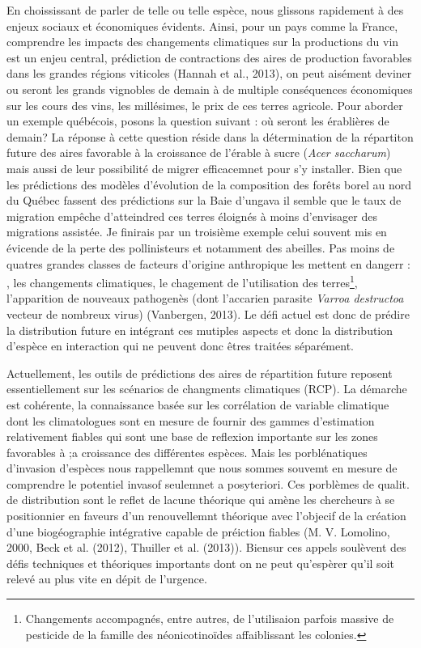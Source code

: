 En choississant de parler de telle ou telle espèce, nous glissons
rapidement à des enjeux sociaux et économiques évidents. Ainsi, pour un
pays comme la France, comprendre les impacts des changements climatiques
sur la productions du vin est un enjeu central, prédiction de
contractions des aires de production favorables dans les grandes régions
viticoles (Hannah et al., 2013), on peut aisément deviner ou seront les
grands vignobles de demain à de multiple conséquences économiques sur
les cours des vins, les millésimes, le prix de ces terres agricole. Pour
aborder un exemple québécois, posons la question suivant : où seront les
érablières de demain? La réponse à cette question réside dans la
détermination de la répartiton future des aires favorable à la
croissance de l'érable à sucre (\emph{Acer saccharum}) mais aussi de
leur possibilité de migrer efficacemnet pour s'y installer. Bien que les
prédictions des modèles d'évolution de la composition des forêts borel
au nord du Québec fassent des prédictions sur la Baie d'ungava il semble
que le taux de migration empêche d'atteindred ces terres éloignés à
moins d'envisager des migrations assistée. Je finirais par un troisième
exemple celui souvent mis en évicende de la perte des pollinisteurs et
notamment des abeilles. Pas moins de quatres grandes classes de facteurs
d'origine anthropique les mettent en dangerr : , les changements
climatiques, le chagement de l'utilisation des terres\footnote{Changements
  accompagnés, entre autres, de l'utilisaion parfois massive de
  pesticide de la famille des néonicotinoïdes affaiblissant les
  colonies.}, l'apparition de nouveaux pathogenès (dont l'accarien
parasite \emph{Varroa destructoa} vecteur de nombreux virus) (Vanbergen,
2013). Le défi actuel est donc de prédire la distribution future en
intégrant ces mutiples aspects et donc la distribution d'espèce en
interaction qui ne peuvent donc êtres traitées séparément.

Actuellement, les outils de prédictions des aires de répartition future
reposent essentiellement sur les scénarios de changments climatiques
(RCP). La démarche est cohérente, la connaissance basée sur les
corrélation de variable climatique dont les climatologues sont en mesure
de fournir des gammes d'estimation relativement fiables qui sont une
base de reflexion importante sur les zones favorables à ;a croissance
des différentes espèces. Mais les porblénatiques d'invasion d'espèces
nous rappellemnt que nous sommes souvemt en mesure de comprendre le
potentiel invasof seulemnet a posyteriori. Ces porblèmes de qualit. de
distribution sont le reflet de lacune théorique qui amène les chercheurs
à se positionnier en faveurs d'un renouvellemnt théorique avec l'objecif
de la création d'une biogéographie intégrative capable de préiction
fiables (M. V. Lomolino, 2000, Beck et al. (2012), Thuiller et al.
(2013)). Biensur ces appels soulèvent des défis techniques et théoriques
importants dont on ne peut qu'espèrer qu'il soit relevé au plus vite en
dépit de l'urgence.

